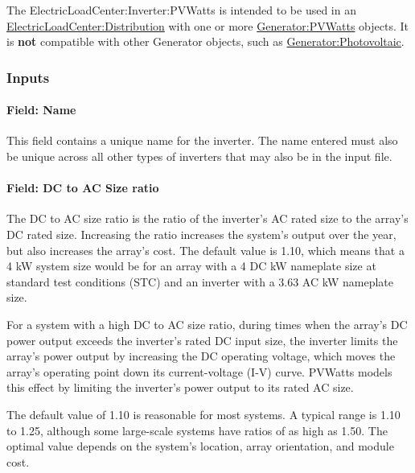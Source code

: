 The ElectricLoadCenter:Inverter:PVWatts is intended to be used in an \hyperref[electricloadcenterdistribution]{ElectricLoadCenter:Distribution} with one or more \hyperref[generatorpvwatts]{Generator:PVWatts} objects. It is \textbf{not} compatible with other Generator objects, such as \hyperref[generatorphotovoltaic-000]{Generator:Photovoltaic}.

\subsubsection{Inputs}\label{inputs-electricloadcenterinverterpvwatts}

\paragraph{Field: Name}\label{field-name-electricloadcenterinverterpvwatts}

This field contains a unique name for the inverter. The name entered
must also be unique across all other types of inverters that may also be
in the input file.

\paragraph{Field: DC to AC Size ratio}\label{field-dc-to-ac-size-ratio-electricloadcenterinverterpvwatts}

The DC to AC size ratio is the ratio of the inverter's AC rated size to
the array's DC rated size. Increasing the ratio increases the system's
output over the year, but also increases the array's cost. The default
value is 1.10, which means that a 4 kW system size would be for an array
with a 4 DC kW nameplate size at standard test conditions (STC) and an
inverter with a 3.63 AC kW nameplate size.

For a system with a high DC to AC size ratio, during times when the
array's DC power output exceeds the inverter's rated DC input size, the
inverter limits the array's power output by increasing the DC operating
voltage, which moves the array's operating point down its
current-voltage (I-V) curve. PVWatts models this effect by limiting the
inverter's power output to its rated AC size.

The default value of 1.10 is reasonable for most systems. A typical
range is 1.10 to 1.25, although some large-scale systems have ratios of
as high as 1.50. The optimal value depends on the system's location,
array orientation, and module cost.

